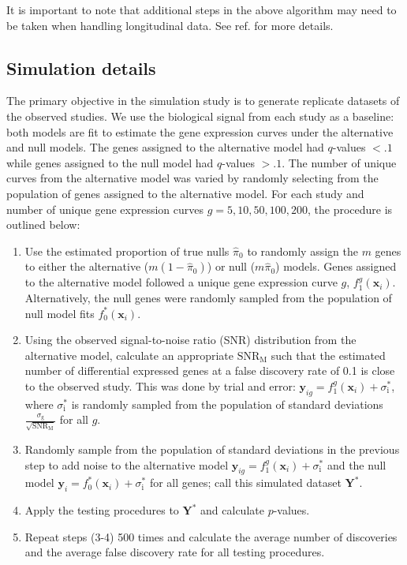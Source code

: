 \documentclass[11pt]{article}
\begin{document}
It is important to note that additional steps in the above algorithm may need to be taken when handling longitudinal data. See ref. \cite{Storey_2005_time} for more details.

\subsection{Simulation details\label{Subsec:sims}}

The primary objective in the simulation study is to generate replicate datasets of the observed studies. We use the biological signal from each study as a baseline: both models are fit to estimate the gene expression curves under the alternative and null models. The genes assigned to the alternative model had $q$-values $<.1$ while genes assigned to the null model had $q$-values $>.1$. The number of unique curves from the alternative model was varied by randomly selecting from the population of genes assigned to the alternative model. For each study and number of unique gene expression curves $g = 5,10,50,100,200$, the procedure is outlined below:

\begin{enumerate}
\item Use the estimated proportion of true nulls $\hat{\pi}_{0}$ to randomly assign the $m$ genes to either the alternative ($m(1-\hat{\pi}_{0})$) or null ($m\hat{\pi}_{0}$) models. Genes assigned to the alternative model followed a unique gene expression curve $g$, $f_{1}^{g}(\mathbf{x}_{i})$. Alternatively, the null genes were randomly sampled from the population of null model fits $f_{0}^{*}(\mathbf{x}_{i})$.
\item Using the observed signal-to-noise ratio (SNR) distribution from the alternative model, calculate an appropriate $\text{SNR}_{\text{M}}$ such that the estimated number of differential expressed genes at a false discovery rate of 0.1 is close to the observed study. This was done by trial and error: $\mathbf{y}_{ig} = f_{1}^{g}(\mathbf{x}_{i}) + \sigma^{*}_{\text{i}}$, where $\sigma^{*}_{\text{i}}$ is randomly sampled from the population of standard deviations $\frac{\sigma_{\text{g}}}{\sqrt{\text{SNR}_{\text{M}}}}$ for all $g$.
\item Randomly sample from the population of standard deviations in the previous step to add noise to the alternative model $\mathbf{y}_{ig} = f_{1}^{g}(\mathbf{x}_{i}) + \sigma^{*}_{\text{i}}$ and the null model $\mathbf{y}_{i} = f_{0}^{*}(\mathbf{x}_{i}) + \sigma^{*}_{\text{i}}$ for all genes; call this simulated dataset $\mathbf{Y}^{*}$.
\item Apply the testing procedures to $\mathbf{Y}^{*}$ and calculate $p$-values.
\item Repeat steps (3-4) 500 times and calculate the average number of discoveries and the average false discovery rate for all testing procedures.
\end{enumerate}
\end{document}
